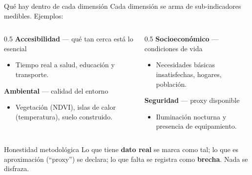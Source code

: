 \documentclass[aspectratio=169,11pt]{beamer}
\newcommand{\lead}[1]{{\color{tPrimary}\large #1}\par\medskip}
\begin{document}
\begin{frame}{Qué hay dentro de cada dimensión}
\lead{Cada dimensión se arma de sub-indicadores medibles. Ejemplos:}
\begin{columns}[T]
\begin{column}{0.5\textwidth}
\footnotesize
\textbf{\color{tAccent}Accesibilidad} — qué tan cerca está lo esencial
\begin{itemize}\footnotesize\item Tiempo real a salud, educación y transporte.\end{itemize}
\smallskip
\textbf{\color{tAccent}Ambiental} — calidad del entorno
\begin{itemize}\footnotesize\item Vegetación (NDVI), islas de calor (temperatura), suelo construido.\end{itemize}
\end{column}
\begin{column}{0.5\textwidth}
\footnotesize
\textbf{\color{tAccent}Socioeconómico} — condiciones de vida
\begin{itemize}\footnotesize\item Necesidades básicas insatisfechas, hogares, población.\end{itemize}
\smallskip
\textbf{\color{tAccent}Seguridad} — proxy disponible
\begin{itemize}\footnotesize\item Iluminación nocturna y presencia de equipamiento.\end{itemize}
\end{column}
\end{columns}
\vfill
\begin{block}{Honestidad metodológica}
Lo que tiene \textbf{dato real} se marca como tal; lo que es aproximación (``proxy'') se declara; lo que falta se registra como \textbf{brecha}. Nada se disfraza.
\end{block}
\end{frame}
\end{document}
